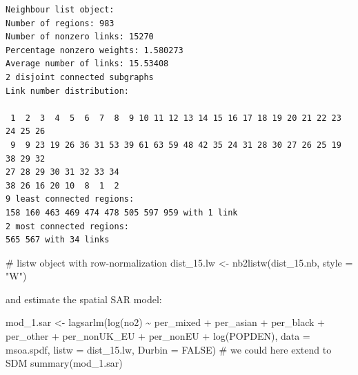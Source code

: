 \documentclass[
  letterpaper,
  DIV=11,
  numbers=noendperiod]{scrreprt}
\newenvironment{Shaded}{\begin{snugshade}}{\end{snugshade}}
\newcommand{\AttributeTok}[1]{\textcolor[rgb]{0.40,0.45,0.13}{#1}}
\newcommand{\CommentTok}[1]{\textcolor[rgb]{0.37,0.37,0.37}{#1}}
\newcommand{\ConstantTok}[1]{\textcolor[rgb]{0.56,0.35,0.01}{#1}}
\newcommand{\DecValTok}[1]{\textcolor[rgb]{0.68,0.00,0.00}{#1}}
\newcommand{\FunctionTok}[1]{\textcolor[rgb]{0.28,0.35,0.67}{#1}}
\newcommand{\NormalTok}[1]{\textcolor[rgb]{0.00,0.23,0.31}{#1}}
\newcommand{\OtherTok}[1]{\textcolor[rgb]{0.00,0.23,0.31}{#1}}
\newcommand{\SpecialCharTok}[1]{\textcolor[rgb]{0.37,0.37,0.37}{#1}}
\newcommand{\StringTok}[1]{\textcolor[rgb]{0.13,0.47,0.30}{#1}}
\begin{document}
\begin{Shaded}
\end{Shaded}

\begin{verbatim}
Neighbour list object:
Number of regions: 983 
Number of nonzero links: 15270 
Percentage nonzero weights: 1.580273 
Average number of links: 15.53408 
2 disjoint connected subgraphs
Link number distribution:

 1  2  3  4  5  6  7  8  9 10 11 12 13 14 15 16 17 18 19 20 21 22 23 24 25 26 
 9  9 23 19 26 36 31 53 39 61 63 59 48 42 35 24 31 28 30 27 26 25 19 38 29 32 
27 28 29 30 31 32 33 34 
38 26 16 20 10  8  1  2 
9 least connected regions:
158 160 463 469 474 478 505 597 959 with 1 link
2 most connected regions:
565 567 with 34 links
\end{verbatim}

\begin{Shaded}
\begin{Highlighting}[]
\CommentTok{\# listw object with row{-}normalization}
\NormalTok{dist\_15.lw }\OtherTok{\textless{}{-}} \FunctionTok{nb2listw}\NormalTok{(dist\_15.nb, }\AttributeTok{style =} \StringTok{"W"}\NormalTok{)}
\end{Highlighting}
\end{Shaded}

and estimate the spatial SAR model:

\begin{Shaded}
\begin{Highlighting}[]
\NormalTok{mod\_1.sar }\OtherTok{\textless{}{-}} \FunctionTok{lagsarlm}\NormalTok{(}\FunctionTok{log}\NormalTok{(no2) }\SpecialCharTok{\textasciitilde{}}\NormalTok{ per\_mixed }\SpecialCharTok{+}\NormalTok{ per\_asian }\SpecialCharTok{+}\NormalTok{ per\_black }\SpecialCharTok{+}\NormalTok{ per\_other}
                      \SpecialCharTok{+}\NormalTok{ per\_nonUK\_EU }\SpecialCharTok{+}\NormalTok{ per\_nonEU  }\SpecialCharTok{+} \FunctionTok{log}\NormalTok{(POPDEN),  }
                      \AttributeTok{data =}\NormalTok{ msoa.spdf, }
                      \AttributeTok{listw =}\NormalTok{ dist\_15.lw,}
                      \AttributeTok{Durbin =} \ConstantTok{FALSE}\NormalTok{) }\CommentTok{\# we could here extend to SDM}
\FunctionTok{summary}\NormalTok{(mod\_1.sar)}
\end{Highlighting}
\end{Shaded}
\end{document}
